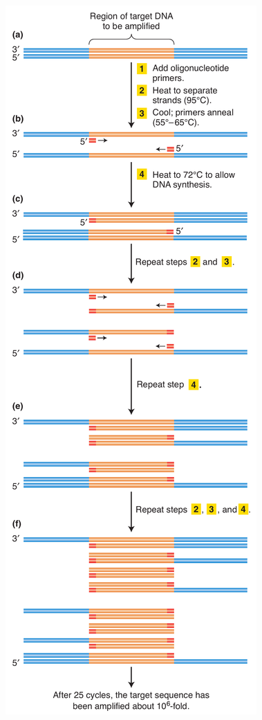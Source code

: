 \documentclass[11pt,dvipsnames,ignorenonframetext,aspectratio=169]{beamer}
\begin{document}
\begin{frame}{}
\protect\hypertarget{section-31}{}

\begin{figure}
\begin{columns}[T,onlytextwidth]
\begin{center}
\includegraphics[width=0.32\linewidth]{./../images/pcr_cycling}
\end{center}

\end{columns}
\end{figure}
\end{frame}
\end{document}
